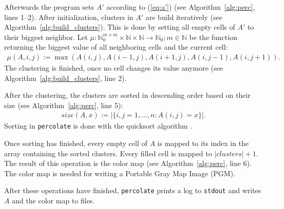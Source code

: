 \documentclass[twoside,11pt]{article}
\def\perc{\texttt{perco\-late}}
\begin{document}
Afterwards the program sets $A'$ according to (\ref{eq:a'})
(see Algorithm~\ref{alg:perc}, lines 1--2).
After initialization, clusters in $A'$ are build
iteratively (see Algorithm~\ref{alg:build_clusters}).
This is done by setting all empty cells of $A'$ to their
biggest neighbor.
Let $\mu:\mathbb{N}_0^{m \times m} \times \mathbb{N} \times
\mathbb{N} \rightarrow \mathbb{N}_0; m \in \mathbb{N}$ be
the function returning the biggest value of all neighboring
cells and the current cell:
\begin{align*}
  \mu(A, i, j) := \max(A(i, j), A(i-1, j), A(i+1, j),
                       A(i, j-1), A(i, j+1)).
\end{align*}
The clustering is finished, once no cell changes its value
anymore (see Algorithm~\ref{alg:build_clusters}, line 2).

After the clustering, the clusters are sorted in descending
order based on their size (see Algorithm~\ref{alg:perc},
line 5):
\begin{align*}
size(A, x) := |\{i,j=1,\dots,n: A(i,j) = x\}|.
\end{align*}
Sorting in \perc{} is done with the quicksort algorithm
\citep[see][]{hoare_1961}.

Once sorting has finished, every empty cell of $A$ is
mapped to its index in the array containing the sorted
clusters.
Every filled cell is mapped to $|clusters| + 1$.
The result of this operation is the color map (see
Algorithm~\ref{alg:perc}, line 6).
The color map is needed for writing a Portable Gray Map
Image (PGM).

After these operations have finished, \perc{} prints a log
to \texttt{stdout} and writes $A$ and the color map to
files.

\begin{algorithm}
  \caption{: \perc{}}
  \label{alg:perc}

  \begin{algorithmic}[1]
  \end{algorithmic}
\end{algorithm}

\begin{algorithm}
  \caption{: build\_clusters($A'$)}
  \label{alg:build_clusters}

  \begin{algorithmic}[1]
      \ENDFOR
    \ENDWHILE
  \end{algorithmic}
\end{algorithm}
\end{document}
